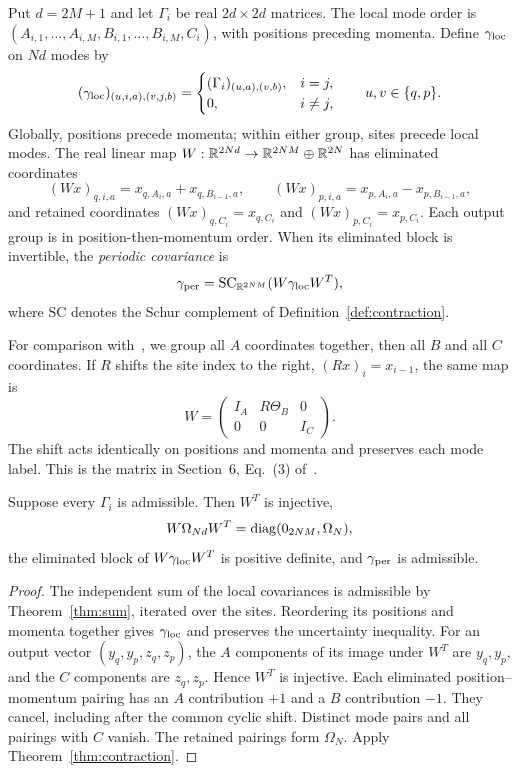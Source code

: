 \begin{definition}\label{def:periodic}
Put $d=2M+1$ and let $\Gamma_i$ be real $2d\times2d$ matrices. The local mode
order is $(A_{i,1},\ldots,A_{i,M},B_{i,1},\ldots,B_{i,M},C_i)$, with positions
preceding momenta. Define $\gamma_{\rm loc}$ on $Nd$ modes by
\[
 (\gamma_{\rm loc})_{(u,i,a),(v,j,b)}=
 \begin{cases}(\Gamma_i)_{(u,a),(v,b)},&i=j,\\0,&i\ne j,\end{cases}
 \qquad u,v\in\{q,p\}.
\]
Globally, positions precede momenta; within either group, sites precede local
modes. The real linear map $W:\mathbb R^{2Nd}\to\mathbb R^{2NM}\oplus\mathbb R^{2N}$ has eliminated
coordinates
\[
 (Wx)_{q,i,a}=x_{q,A_i,a}+x_{q,B_{i-1},a},\qquad
 (Wx)_{p,i,a}=x_{p,A_i,a}-x_{p,B_{i-1},a},
\]
and retained coordinates $(Wx)_{q,C_i}=x_{q,C_i}$ and
$(Wx)_{p,C_i}=x_{p,C_i}$. Each output group is in position-then-momentum order.
When its eliminated block is invertible, the \emph{periodic covariance} is
\[
 \gamma_{\rm per}=\mathrm{SC}_{\mathbb R^{2NM}}(W\gamma_{\rm loc}W^T),
\]
where $\mathrm{SC}$ denotes the Schur complement of Definition~\ref{def:contraction}.
\end{definition}
For comparison with~, we group all $A$ coordinates together, then all $B$
and all $C$ coordinates. If $R$ shifts the site index to the right,
$(Rx)_i=x_{i-1}$, the same map is
\[
 W=\begin{pmatrix}I_A&R\Theta_B&0\\0&0&I_C\end{pmatrix}.
\]
The shift acts identically on positions and momenta and preserves each mode
label. This is the matrix in Section~6, Eq.~(3) of~\cite{schuch}.

\begin{theorem}\label{thm:periodic}
Suppose every $\Gamma_i$ is admissible. Then $W^T$ is injective,
\[
 W\Omega_{Nd}W^T=\operatorname{diag}(0_{2NM},\Omega_N),
\]
the eliminated block of $W\gamma_{\rm loc}W^T$ is positive definite, and
$\gamma_{\rm per}$ is admissible.
\end{theorem}
\begin{proof}
The independent sum of the local covariances is admissible by
Theorem~\ref{thm:sum}, iterated over the sites. Reordering its positions and
momenta together gives $\gamma_{\rm loc}$ and preserves the uncertainty inequality.
For an output vector $(y_q,y_p,z_q,z_p)$, the $A$ components of its image under
$W^T$ are $y_q,y_p$, and the $C$ components are $z_q,z_p$. Hence $W^T$ is injective.
Each eliminated position--momentum pairing has an $A$ contribution $+1$ and a
$B$ contribution $-1$. They cancel, including after the common cyclic shift.
Distinct mode pairs and all pairings with $C$ vanish. The retained pairings
form $\Omega_N$. Apply Theorem~\ref{thm:contraction}.
\end{proof}

